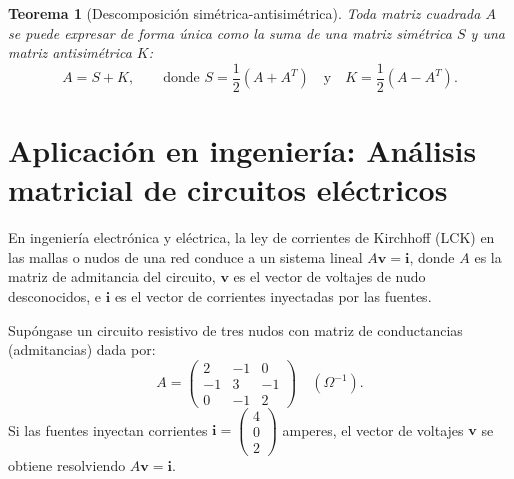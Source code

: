 \documentclass[11pt,letterpaper]{article}
\theoremstyle{definition}
\theoremstyle{plain}
\newtheorem{teorema}[definicion]{Teorema}
\newcommand{\vv}[1]{\mathbf{#1}}
\begin{document}
\begin{teorema}[Descomposición simétrica-antisimétrica]
Toda matriz cuadrada $A$ se puede expresar de forma única como la suma de una matriz simétrica $S$
y una matriz antisimétrica $K$:
\[
A = S + K, \qquad \text{donde } S = \frac{1}{2}(A + A^T) \quad \text{y} \quad K = \frac{1}{2}(A - A^T).
\]
\end{teorema}

\section{Aplicación en ingeniería: Análisis matricial de circuitos eléctricos}

En ingeniería electrónica y eléctrica, la ley de corrientes de Kirchhoff (LCK) en las mallas o nudos de una red conduce a un sistema lineal $A\vv{v} = \vv{i}$, donde $A$ es la matriz de admitancia del circuito, $\vv{v}$ es el vector de voltajes de nudo desconocidos, e $\vv{i}$ es el vector de corrientes inyectadas por las fuentes.

Supóngase un circuito resistivo de tres nudos con matriz de conductancias (admitancias) dada por:
\[
A = \begin{pmatrix} 2 & -1 & 0 \\ -1 & 3 & -1 \\ 0 & -1 & 2 \end{pmatrix} \quad (\Omega^{-1}).
\]
Si las fuentes inyectan corrientes $\vv{i} = \begin{pmatrix} 4 \\ 0 \\ 2 \end{pmatrix}$ amperes, el vector de voltajes $\vv{v}$ se obtiene resolviendo $A\vv{v} = \vv{i}$.
\end{document}
